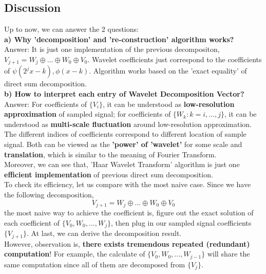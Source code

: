 \documentclass{article}
\begin{document}
\subsection{Discussion}
Up to now, we can answer the 2 questions:
\vspace{4pt}
\\
\textbf{a) Why 'decomposition' and  're-construction' algorithm works?}
\\
Answer: It is just one implementation of the previous decompositon, $V_{j+1} = W_j \oplus... \oplus W_0 \oplus V_0$. Wavelet coefficients just correspond to the coefficients of $\psi(2^jx-k), \phi(x-k)$. Algorithm works based on the 'exact equality' of direct sum decomposition.
\vspace{4pt}
\\
\textbf{b) How to interpret each entry of Wavelet Decomposition Vector?}
\\
Answer: For coefficients of $\{V_i\}$, it can be understood as \textbf{low-resolution approximation} of sampled signal; for coefficients of $\{W_k: k = i, ..., j\}$, it can be understood as \textbf{multi-scale fluctuation} around low-resolution approximation. The different indices of coefficients correspond to different location of sample signal. Both can be viewed as the \textbf{'power' of 'wavelet'} for some scale and\textbf{ translation}, which is similar to the meaning of Fourier Transform.
\vspace{4pt}
\\
Moreover, we can see that, 'Haar Wavelet Transform' algorithm is just one \textbf{efficient implementation} of previous direct sum decomposition.
\vspace{4pt}
\\
To check its efficiency, let us compare with the most naive case. Since we have the following decomposition,
\begin{equation}
	V_{j+1} = W_j \oplus... \oplus W_0 \oplus V_0
	\label{8}
\end{equation}
the most naive way to achieve the coefficient is, figure out the exact solution of each coefficient of $\{ V_{0}, W_{0}, ..., W_{j}\}$, then plug in our sampled signal coefficients $\{ V_{j+1}\}$. At last, we can derive the decomposition result.
\vspace{4pt}
\\
However, observation is, \textbf{there exists tremendous repeated (redundant) computation}! For example, the calculate of $\{ V_{0}, W_{0}, ..., W_{j-1}\}$ will share the same computation since all of them are decomposed from $\{ V_{j}\}$. 
\end{document}

